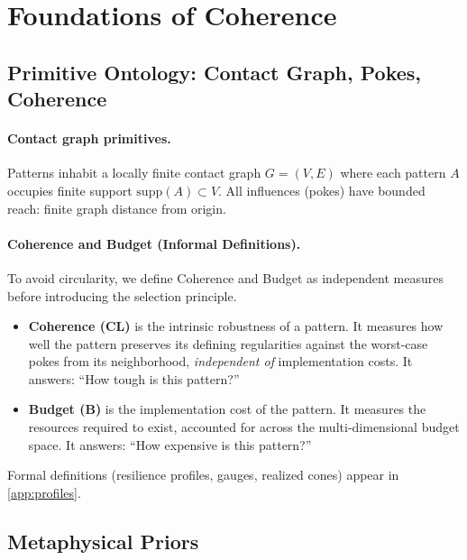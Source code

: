 
\section{Foundations of Coherence}
\label{sec:philosophical-foundations}

\subsection{Primitive Ontology: Contact Graph, Pokes, Coherence}
\label{subsec:contact-graph}

\paragraph{Contact graph primitives.}
Patterns inhabit a locally finite contact graph $G=(V,E)$ where each pattern $A$ occupies finite support $\mathrm{supp}(A)\subset V$. All influences (pokes) have bounded reach: finite graph distance from origin.

\paragraph{Coherence and Budget (Informal Definitions).}
To avoid circularity, we define Coherence and Budget as independent measures before introducing the selection principle.
\begin{itemize}[noitemsep]
    \item \textbf{Coherence (CL)} is the intrinsic robustness of a pattern. It measures how well the pattern preserves its defining regularities against the worst-case pokes from its neighborhood, \emph{independent of} implementation costs. It answers: ``How tough is this pattern?''
    \item \textbf{Budget (B)} is the implementation cost of the pattern. It measures the resources required to exist, accounted for across the multi-dimensional budget space. It answers: ``How expensive is this pattern?''
\end{itemize}
Formal definitions (resilience profiles, gauges, realized cones) appear in \cref{app:profiles}.

\subsection{Metaphysical Priors}
\label{subsec:priors}


